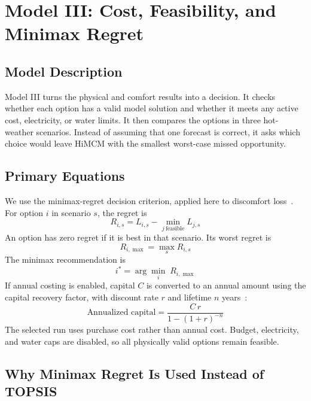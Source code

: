 \section{Model III: Cost, Feasibility, and Minimax Regret}
\subsection{Model Description}
 
Model III turns the physical and comfort results into a decision. It checks whether each option has a valid model solution and whether it meets any active cost, electricity, or water limits. It then compares the options in three hot-weather scenarios. Instead of assuming that one forecast is correct, it asks which choice would leave HiMCM with the smallest worst-case missed opportunity.
 
\subsection{Primary Equations}
 
We use the minimax-regret decision criterion, applied here to discomfort loss~\cite{savage1951}. For option $i$ in scenario $s$, the regret is
\begin{equation}
R_{i,s} = L_{i,s} - \min_{j\ \text{feasible}} L_{j,s}
\end{equation}
An option has zero regret if it is best in that scenario. Its worst regret is
\begin{equation}
R_{i,\max} = \max_{s} R_{i,s}
\end{equation}
The minimax recommendation is
\begin{equation}
i^{*} = \arg\min_{i}\; R_{i,\max}
\end{equation}
If annual costing is enabled, capital $C$ is converted to an annual amount using the capital recovery factor, with discount rate $r$ and lifetime $n$ years~\cite{nlr_capital_recovery}:
\begin{equation}
\text{Annualized capital} = \frac{C\, r}{1 - (1 + r)^{-n}}
\end{equation}
The selected run uses purchase cost rather than annual cost. Budget, electricity, and water caps are disabled, so all physically valid options remain feasible.
 
\subsection{Why Minimax Regret Is Used Instead of TOPSIS}
 
